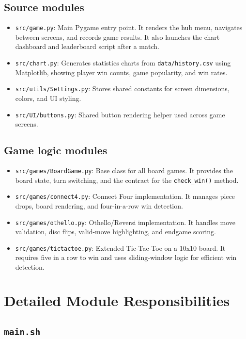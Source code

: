 \documentclass[12pt,a4paper]{article}
\begin{document}
\subsection{Source modules}

\begin{itemize}
    \item \texttt{src/game.py}: Main Pygame entry point. It renders the hub menu, navigates between screens, and records game results. It also launches the chart dashboard and leaderboard script after a match.
    \item \texttt{src/chart.py}: Generates statistics charts from \texttt{data/history.csv} using Matplotlib, showing player win counts, game popularity, and win rates.
    \item \texttt{src/utils/Settings.py}: Stores shared constants for screen dimensions, colors, and UI styling.
    \item \texttt{src/UI/buttons.py}: Shared button rendering helper used across game screens.
\end{itemize}

\subsection{Game logic modules}

\begin{itemize}
    \item \texttt{src/games/BoardGame.py}: Base class for all board games. It provides the board state, turn switching, and the contract for the \texttt{check\_win()} method.
    \item \texttt{src/games/connect4.py}: Connect Four implementation. It manages piece drops, board rendering, and four-in-a-row win detection.
    \item \texttt{src/games/othello.py}: Othello/Reversi implementation. It handles move validation, disc flips, valid-move highlighting, and endgame scoring.
    \item \texttt{src/games/tictactoe.py}: Extended Tic-Tac-Toe on a 10x10 board. It requires five in a row to win and uses sliding-window logic for efficient win detection.
\end{itemize}

\section{Detailed Module Responsibilities}

\subsection{\texttt{main.sh}}
\end{document}
